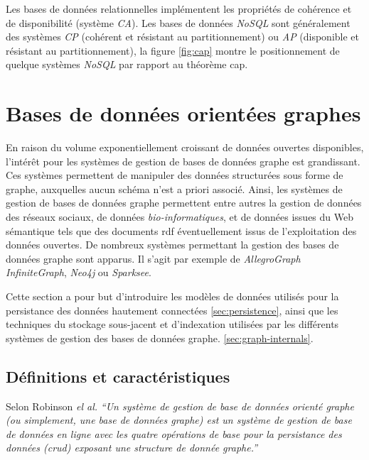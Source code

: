   

  \newpage

  Les bases de données relationnelles implémentent les propriétés de
  cohérence et de disponibilité (système \emph{CA}). Les bases de
  données \emph{NoSQL} sont généralement des systèmes \emph{CP}
  (cohérent et résistant au partitionnement) ou \emph{AP} (disponible
  et résistant au partitionnement), la figure \ref{fig:cap} montre
  le positionnement de quelque systèmes \emph{NoSQL} par rapport au
  théorème \acrshort{cap}.

\section{Bases de données orientées graphes}
\label{sec:graph-database-overview}
En raison du volume exponentiellement croissant de données ouvertes
disponibles, l'intérêt pour les systèmes de gestion de bases de
données graphe est grandissant. Ces systèmes permettent de manipuler
des données structurées sous forme de graphe, auxquelles aucun schéma
n'est a priori associé. Ainsi, les systèmes de gestion de bases de
données graphe permettent entre autres la gestion de données des
réseaux sociaux, de données \textit{bio-informatiques}, et de données
issues du Web sémantique tels que des documents \acrshort{rdf}
éventuellement issus de l'exploitation des données ouvertes. De
nombreux systèmes permettant la gestion des bases de données graphe
sont apparus. Il s'agit par exemple de \textit{AllegroGraph}
\textit{InfiniteGraph}, \textit{Neo4j} ou \textit{Sparksee}.\medskip

Cette section a pour but d'introduire les modèles de données utilisés
pour la persistance des données hautement connectées
\ref{sec:persistence}, ainsi que les techniques du stockage
sous-jacent et d'indexation utilisées par les différents systèmes de
gestion des bases de données graphe.
\ref{sec:graph-internals}.\medskip

  \subsection{Définitions et caractéristiques}
  \label{sec:graphdb-defs}

  Selon Robinson \emph{el al.} \cite{robinson2013graph} \textit{``Un
    système de gestion de base de données orienté graphe (ou
    simplement, une base de données graphe) est un système de gestion
    de base de données en ligne avec les quatre
    opérations de base pour la persistance des données
    (\acrshort{crud}) exposant une structure de donnée
    graphe.''}\bigskip

